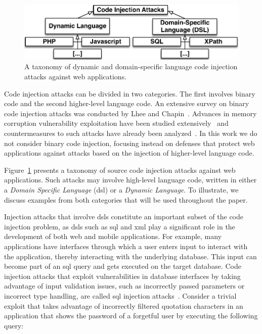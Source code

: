 \documentclass[10pt,journal,compsoc]{IEEEtran}
\begin{document}
\begin{figure}
\begin{center}
\leavevmode
\includegraphics[scale=0.52]{attack-tree-uml.pdf}
\end{center}
\vspace{-6mm}
\caption{\label{fig:taxonomy}A taxonomy of dynamic and domain-specific
language code injection attacks against web applications.}
\vspace{-5.8mm}
\end{figure}

Code injection attacks can be divided in two categories. The first
involves binary code and the second higher-level language code. An
extensive survey on binary code injection attacks was conducted by
Lhee and Chapin~\cite{LC03}. Advances in memory corruption vulnerability
exploitation have been studied extensively~\cite{PB04, SPWS13}
and countermeasures to such attacks
have already been analyzed~\cite{YJP12}.
In this work we do not consider binary code injection,
focusing instead on defenses
that protect web applications against attacks based on the
injection of higher-level language code.

Figure~\ref{fig:taxonomy} presents a taxonomy of source
code injection attacks against web applications.
Such attacks may involve high-level language code, written in either a
{\it Domain Specific Language} ({\sc dsl}) or a {\it Dynamic Language}.
To illustrate, we discuss examples from both categories
that will be used throughout the paper.

Injection attacks that involve {\sc dsl}s constitute an important
subset of the code injection problem, as {\sc dsl}s such as
{\sc sql} and {\sc xml} play a significant role in the development of
both web and mobile applications. For example, many applications have
interfaces through which a user enters input to interact with the
application, thereby interacting with the underlying database. This
input can become part of an {\sc sql} query and gets executed on the
target database. Code injection attacks that exploit vulnerabilities
in database interfaces by taking advantage of input validation issues,
such as incorrectly passed parameters or incorrect type handling, are
called {\sc sql} injection attacks~\cite{HVO06,SW06}.
Consider a trivial exploit that takes advantage of incorrectly
filtered quotation characters in an application that shows the
password of a forgetful user by executing the following
query:
\end{document}
